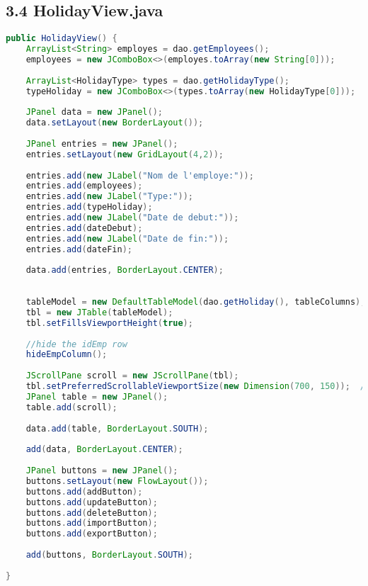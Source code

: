 \documentclass[a4paper,12pt]{report}
\begin{document}
\subsection*{\textcolor{mygreen}{3.4 HolidayView.java}}
\begin{lstlisting}[language=Java, caption=La vue pour Holiday]
public HolidayView() {
    ArrayList<String> employes = dao.getEmployees();
    employees = new JComboBox<>(employes.toArray(new String[0]));
    
    ArrayList<HolidayType> types = dao.getHolidayType();
    typeHoliday = new JComboBox<>(types.toArray(new HolidayType[0]));
    
    JPanel data = new JPanel();
    data.setLayout(new BorderLayout());
    
    JPanel entries = new JPanel();
    entries.setLayout(new GridLayout(4,2));
    
    entries.add(new JLabel("Nom de l'employe:"));
    entries.add(employees);
    entries.add(new JLabel("Type:"));
    entries.add(typeHoliday);
    entries.add(new JLabel("Date de debut:"));
    entries.add(dateDebut);
    entries.add(new JLabel("Date de fin:"));
    entries.add(dateFin);
    
    data.add(entries, BorderLayout.CENTER);
    
    
    tableModel = new DefaultTableModel(dao.getHoliday(), tableColumns);
    tbl = new JTable(tableModel);
    tbl.setFillsViewportHeight(true);
    
    //hide the idEmp row
    hideEmpColumn();
    
    JScrollPane scroll = new JScrollPane(tbl);	
    tbl.setPreferredScrollableViewportSize(new Dimension(700, 150));  // Adjust as needed
    JPanel table = new JPanel();
    table.add(scroll);
    
    data.add(table, BorderLayout.SOUTH);
    
    add(data, BorderLayout.CENTER);
    
    JPanel buttons = new JPanel();
    buttons.setLayout(new FlowLayout());
    buttons.add(addButton);
    buttons.add(updateButton);
    buttons.add(deleteButton);
    buttons.add(importButton);
    buttons.add(exportButton);
    
    add(buttons, BorderLayout.SOUTH);
    
}
\end{lstlisting}
\end{document}
